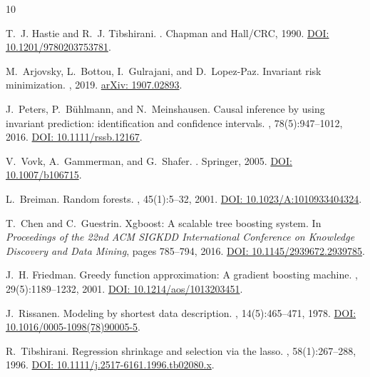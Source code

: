 \documentclass[11pt,a4paper]{article}
\begin{document}
\begin{thebibliography}{10}

T.~J. Hastie and R.~J. Tibshirani.
.
\newblock Chapman and Hall/CRC, 1990.
\newblock \href{https://doi.org/10.1201/9780203753781}{DOI: 10.1201/9780203753781}.

M.~Arjovsky, L.~Bottou, I.~Gulrajani, and D.~Lopez-Paz.
\newblock Invariant risk minimization.
, 2019.
\newblock \href{https://arxiv.org/abs/1907.02893}{arXiv: 1907.02893}.

J.~Peters, P.~B{\"u}hlmann, and N.~Meinshausen.
\newblock Causal inference by using invariant prediction: identification and confidence intervals.
, 78(5):947--1012, 2016.
\newblock \href{https://doi.org/10.1111/rssb.12167}{DOI: 10.1111/rssb.12167}.

V.~Vovk, A.~Gammerman, and G.~Shafer.
.
\newblock Springer, 2005.
\newblock \href{https://doi.org/10.1007/b106715}{DOI: 10.1007/b106715}.

L.~Breiman.
\newblock Random forests.
, 45(1):5--32, 2001.
\newblock \href{https://doi.org/10.1023/A:1010933404324}{DOI: 10.1023/A:1010933404324}.

T.~Chen and C.~Guestrin.
\newblock Xgboost: A scalable tree boosting system.
\newblock In {\em Proceedings of the 22nd ACM SIGKDD International Conference on Knowledge Discovery and Data Mining}, pages 785--794, 2016.
\newblock \href{https://doi.org/10.1145/2939672.2939785}{DOI: 10.1145/2939672.2939785}.

J.~H. Friedman.
\newblock Greedy function approximation: A gradient boosting machine.
, 29(5):1189--1232, 2001.
\newblock \href{https://doi.org/10.1214/aos/1013203451}{DOI: 10.1214/aos/1013203451}.

J.~Rissanen.
\newblock Modeling by shortest data description.
, 14(5):465--471, 1978.
\newblock \href{https://doi.org/10.1016/0005-1098(78)90005-5}{DOI: 10.1016/0005-1098(78)90005-5}.

R.~Tibshirani.
\newblock Regression shrinkage and selection via the lasso.
, 58(1):267--288, 1996.
\newblock \href{https://doi.org/10.1111/j.2517-6161.1996.tb02080.x}{DOI: 10.1111/j.2517-6161.1996.tb02080.x}.


\end{thebibliography}
\end{document}
